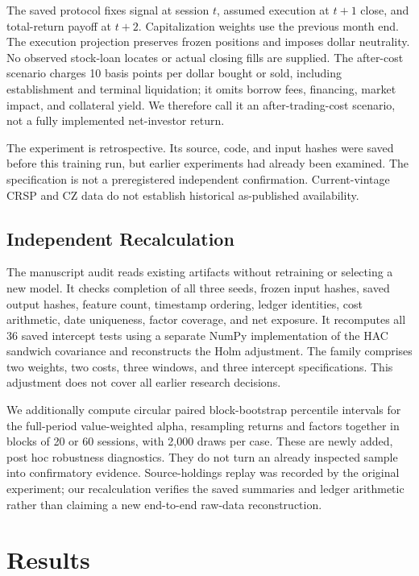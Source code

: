 \documentclass{article}
\begin{document}
The saved protocol fixes signal at session $t$, assumed execution at $t+1$ close, and total-return payoff at $t+2$. Capitalization weights use the previous month end. The execution projection preserves frozen positions and imposes dollar neutrality. No observed stock-loan locates or actual closing fills are supplied. The after-cost scenario charges 10 basis points per dollar bought or sold, including establishment and terminal liquidation; it omits borrow fees, financing, market impact, and collateral yield. We therefore call it an after-trading-cost scenario, not a fully implemented net-investor return.

The experiment is retrospective. Its source, code, and input hashes were saved before this training run, but earlier experiments had already been examined. The specification is not a preregistered independent confirmation. Current-vintage CRSP and CZ data do not establish historical as-published availability.

\subsection{Independent Recalculation}
The manuscript audit reads existing artifacts without retraining or selecting a new model. It checks completion of all three seeds, frozen input hashes, saved output hashes, feature count, timestamp ordering, ledger identities, cost arithmetic, date uniqueness, factor coverage, and net exposure. It recomputes all 36 saved intercept tests using a separate NumPy implementation of the HAC sandwich covariance and reconstructs the Holm adjustment. The family comprises two weights, two costs, three windows, and three intercept specifications. This adjustment does not cover all earlier research decisions.

We additionally compute circular paired block-bootstrap percentile intervals for the full-period value-weighted alpha, resampling returns and factors together in blocks of 20 or 60 sessions, with 2,000 draws per case. These are newly added, post hoc robustness diagnostics. They do not turn an already inspected sample into confirmatory evidence. Source-holdings replay was recorded by the original experiment; our recalculation verifies the saved summaries and ledger arithmetic rather than claiming a new end-to-end raw-data reconstruction.

\section{Results}
\end{document}
